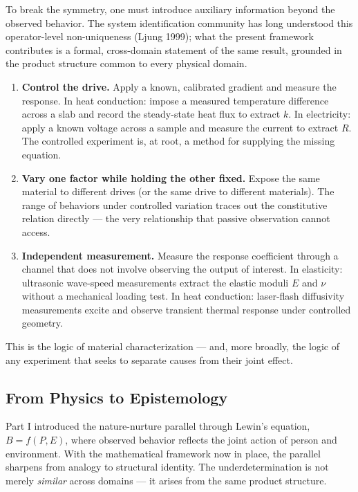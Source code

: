 \documentclass[
  letterpaper,
  DIV=11,
  numbers=noendperiod]{scrartcl}
\begin{document}
To break the symmetry, one must introduce auxiliary information beyond
the observed behavior. The system identification community has long
understood this operator-level non-uniqueness (Ljung 1999); what the
present framework contributes is a formal, cross-domain statement of the
same result, grounded in the product structure common to every physical
domain.

\begin{enumerate}
\def\labelenumi{\arabic{enumi}.}
\item
  \textbf{Control the drive.} Apply a known, calibrated gradient and
  measure the response. In heat conduction: impose a measured
  temperature difference across a slab and record the steady-state heat
  flux to extract \(k\). In electricity: apply a known voltage across a
  sample and measure the current to extract \(R\). The controlled
  experiment is, at root, a method for supplying the missing equation.
\item
  \textbf{Vary one factor while holding the other fixed.} Expose the
  same material to different drives (or the same drive to different
  materials). The range of behaviors under controlled variation traces
  out the constitutive relation directly --- the very relationship that
  passive observation cannot access.
\item
  \textbf{Independent measurement.} Measure the response coefficient
  through a channel that does not involve observing the output of
  interest. In elasticity: ultrasonic wave-speed measurements extract
  the elastic moduli \(E\) and \(\nu\) without a mechanical loading
  test. In heat conduction: laser-flash diffusivity measurements excite
  and observe transient thermal response under controlled geometry.
\end{enumerate}

This is the logic of material characterization --- and, more broadly,
the logic of any experiment that seeks to separate causes from their
joint effect.

\subsection{From Physics to
Epistemology}\label{from-physics-to-epistemology}

Part I introduced the nature-nurture parallel through Lewin's equation,
\(B = f(P, E)\), where observed behavior reflects the joint action of
person and environment. With the mathematical framework now in place,
the parallel sharpens from analogy to structural identity. The
underdetermination is not merely \emph{similar} across domains --- it
arises from the same product structure.
\end{document}
